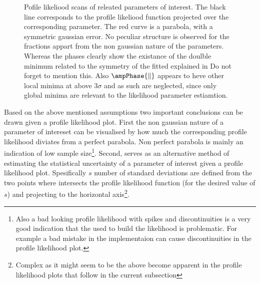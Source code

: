 \begin{figure}[h]
  \centering
  \begin{subfigure}{0.5\textwidth}
    \scalebox{0.60}{}
    \caption{}
    \label{nll_f0}
  \end{subfigure}%
  \hfill%
  \begin{subfigure}{0.5\textwidth}
    \scalebox{0.60}{}
    \caption{}
    \label{nll_fpar}
  \end{subfigure}
  \begin{subfigure}{0.5\textwidth}
    \scalebox{0.60}{}
    \caption{}
    \label{nll_AparPhase}
  \end{subfigure}%
  \hfill%
  \begin{subfigure}{0.5\textwidth}
    \scalebox{0.60}{}
    \caption{}
    \label{nll_AperpPhase}
  \end{subfigure}
\caption{Pofile likeliood scans of \pwave releated parameters of interest. The black line corresponds to the profile likeliood
         function projected over the corresponding parameter. The red curve is a parabola, with a symmetric gaussian 
         error. No peculiar structure is observed for the \pwave fractions appart from the non gaussian nature of the parameters.
         Whereas the phases clearly show the existance of the doulble minimum related to the symmetry of the fitted \pdf 
         explained in  {\color{red} Do not forget to mention this}.
         Also $\ampPhase{\parallel}$ appears to heve other local minima at above $3\sigma$ and as such are neglected, since only
         global minima are relevant to the likelihood parameter estiamtion. }
\end{figure}

Based on the above mentioned assumptions two important conclusions can be drawn given a profile likelihood plot. First the non 
gaussian nature of a parameter of intereset can be visualised by how much the corresponding profile likelihood diviates from
a perfect parabola. Non perfect parabola is mainly an indication of low sample 
size\footnote{Also a bad looking profile likelihood with spikes and discontinuities is a very good indication that the \pdf
used to build the likelihood is problematic. For example a bad mistake in the implementaion can cause discontinuities in the
profile likelihood plot.}. Second,  serves as an alternative method of estimating the statistical uncertainty
of a parameter of interest given a profile likelihood plot. Spesifically $s$ number of standard deviations are defined from the two 
points where  intersects the profile likelihood function (for the desired value of $s$) and projecting to 
the horizontal 
axis\footnote{Complex as it might seem to be the above become apparent in the profile likelihood plots that follow in the current subsection}. 

